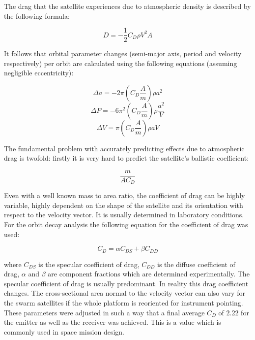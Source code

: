 The drag that the satellite experiences due to atmospheric density is described by the following formula:

\begin{equation}
D = -\frac{1}{2} C_D \rho V^2A
\label{drag}
\end{equation}

It follows that orbital parameter changes (semi-major axis, period and velocity respectively) per orbit are calculated using the following equations (assuming negligible eccentricity):

\begin{equation}
\Delta a = -2 \pi \left( C_D \frac{A}{m} \right) \rho a^2
\label{deltaSMA}
\end{equation}
\begin{equation}
\Delta P = -6 \pi^2 \left( C_D \frac{A}{m} \right) \rho \frac{a^2}{V}
\label{deltaP}
\end{equation}
\begin{equation}
\Delta V = \pi \left( C_D \frac{A}{m} \right) \rho aV
\label{deltaV}
\end{equation}

The fundamental problem with accurately predicting effects due to atmospheric drag is twofold: firstly it is very hard to predict the satellite's ballistic coefficient:

\begin{equation}
\frac{m}{AC_D}
\label{ball}
\end{equation}

Even with a well known mass to area ratio, the coefficient of drag can be highly variable, highly dependent on the shape of the satellite and its orientation with respect to the velocity vector. It is usually determined in laboratory conditions. For the orbit decay analysis the following equation for the coefficient of drag was used:

\begin{equation}
C_D = \alpha C_{DS} + \beta C_{DD}
\label{cd}
\end{equation}

where $C_{DS}$ is the specular coefficient of drag, $C_{DD}$ is the diffuse coefficient of drag, $\alpha$ and $\beta$ are component fractions which are determined experimentally. The specular coefficient of drag is usually predominant. In reality this drag coefficient changes. The cross-sectional area normal to the velocity vector can also vary for the swarm satellites if the whole platform is reoriented for instrument pointing. These parameters were adjusted in such a way that a final average $C_D$ of 2.22 for the emitter as well as the receiver was achieved. This is a value which is commonly used in space mission design.

